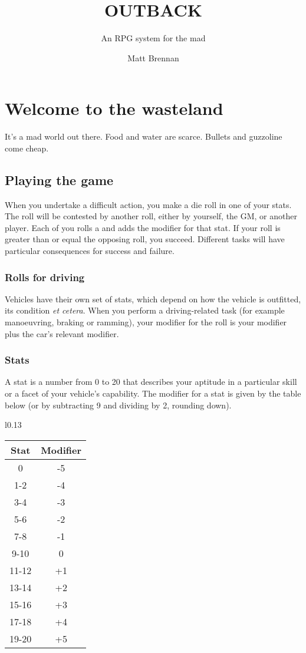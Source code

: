 \documentclass[10pt, a4paper, twocolumn]{book}
\title{\uppercase{Outback}}
\subtitle{An RPG system for the mad}
\author{Matt Brennan}
\date{}
\begin{document}
\frontmatter
\maketitle
\tableofcontents

\mainmatter
\chapter{Welcome to the wasteland}
It's a mad world out there. Food and water are scarce. Bullets and guzzoline
come cheap. 
\section{Playing the game}
When you undertake a difficult action, you make a die roll in one of your stats.
The roll will be contested by another roll, either by yourself, the GM, or
another player. Each of you rolls a  and adds the modifier for that
stat. If your roll is greater than or equal the opposing roll, you succeed. Different tasks will have particular consequences for success and failure.

\subsection{Rolls for driving}
Vehicles have their own set of stats, which depend on how the vehicle is
outfitted, its condition \emph{et cetera}. When you perform a driving-related
task (for example manoeuvring, braking or ramming), your modifier for the roll
is your  modifier plus the car's relevant modifier.

\subsection{Stats}
A stat is a number from 0 to 20 that describes your aptitude in a particular
skill or a facet of your vehicle's capability. The modifier for a stat is
given by the table below (or by subtracting 9 and dividing by 2, rounding
down).

\begin{wraptable}{l}{0.13\textwidth}
\vspace*{-10pt}
\begin{tabular}{cc}
  Stat  & Modifier \\
  \hline 
  0     & -5       \\
  1-2   & -4       \\
  3-4   & -3       \\
  5-6   & -2       \\
  7-8   & -1       \\
  9-10  &  0       \\
  11-12 & +1       \\
  13-14 & +2       \\
  15-16 & +3       \\
  17-18 & +4       \\
  19-20 & +5
\end{tabular}
\vspace*{-10pt}
\end{wraptable}
\end{document}
